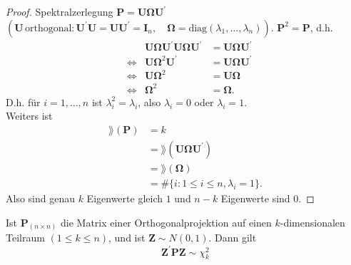 \documentclass{tstextbook}
\begin{document}
\begin{proof}
	Spektralzerlegung $ \mathbf{P} = \mathbf{U} \mathbf{\Omega} \mathbf{U}^\prime $ $ (\mathbf{U} \, \text{orthogonal}: \mathbf{U}^\prime \mathbf{U} = \mathbf{U} \mathbf{U}^\prime = \mathbf{I}_n, \quad \mathbf{\Omega} = \text{diag}(\lambda_1,\ldots, \lambda_n)) $. 
	$ \mathbf{P}^2 = \mathbf{P} $, d.h. 
	\[
	\begin{aligned}
		& & \mathbf{U}\mathbf{\Omega} \mathbf{U}^\prime \mathbf{U} \mathbf{\Omega} \mathbf{U}^\prime & = \mathbf{U}\mathbf{\Omega} \mathbf{U}^\prime \\
		& \Leftrightarrow & \mathbf{U} \mathbf{\Omega}^2 \mathbf{U}^\prime &= \mathbf{U} \mathbf{\Omega} \mathbf{U}^\prime \\
		& \Leftrightarrow & \mathbf{U} \mathbf{\Omega}^2 &= \mathbf{U} \mathbf{\Omega} \\
		& \Leftrightarrow & \mathbf{\Omega}^2 &= \mathbf{\Omega}.
	\end{aligned}
	\]
	D.h. für $ i=1,\ldots, n  $ ist $ \lambda_i^2 = \lambda_i $, also $ \lambda_i = 0 $ oder $ \lambda_i = 1 $. \\
	Weiters ist  
	\[
	\begin{aligned}	
	\rang(\mathbf{P}) & = k \\
	& = \rang(\mathbf{U} \mathbf{\Omega} \mathbf{U}^\prime) \\
	& = \rang(\mathbf{\Omega}) \\
	& = \# \{i: 1\le i \le n, \lambda_i = 1\}.
	\end{aligned}
	\]  
	Also sind genau $ k $ Eigenwerte gleich $ 1 $ und $ n-k $ Eigenwerte sind $ 0 $.
\end{proof}
	

\begin{theorem}
	
		Ist $ \mathbf{P}_{(n\times n)} $ die Matrix einer Orthogonalprojektion auf einen $ k $-dimensionalen Teilraum $ (1 \le k \le n) $, und ist $ \mathbf{Z} \sim N\left(0,1 \right) $. Dann gilt \[ \mathbf{Z}^\prime \mathbf{P}\mathbf{Z}\sim \chi_k^2 \]
	
	\end{theorem}
\end{document}
